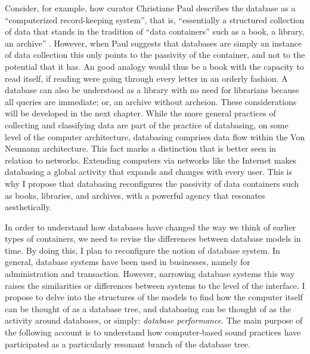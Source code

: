 Consider, for example, how curator Christiane Paul describes the database as a ``computerized record-keeping system'', that is, ``essentially a structured collection of data that stands in the tradition of ``data containers'' such as a book, a library, an archive'' \parencite[95]{Pau07:The}. However, when Paul suggests that databases are simply an instance of data collection this only points to the passivity of the container, and not to the potential that it has. An good analogy would thus be a book with the capacity to read itself, if reading were going through every letter in an orderly fashion. A database can also be understood as a library with no need for librarians because all queries are immediate; or, an archive without archeion. These considerations will be developed in the next chapter. While the more general practices of collecting and classifying data are part of the practice of databasing, on some level of the computer architecture, databasing comprises data flow within the Von Neumann architecture. This fact marks a distinction that is better seen in relation to networks. Extending computers via networks like the Internet makes databasing a global activity that expands and changes with every user. This is why I propose that databasing reconfigures the passivity of data containers such as books, libraries, and archives, with a powerful agency that resonates aesthetically.

In order to understand how databases have changed the way we think of earlier types of containers, we need to revise the differences between database models in time. By doing this, I plan to reconfigure the notion of database system. In general, database systems have been used in businesses, namely for administration and transaction. However, narrowing database systems this way raises the similarities or differences between systems to the level of the interface. I propose to delve into the structures of the models to find how the computer itself can be thought of as a database tree, and databasing can be thought of as the activity around databases, or simply: \textit{database performance}. The main purpose of the following account is to understand how computer-based sound practices have participated as a particularly resonant branch of the database tree.

